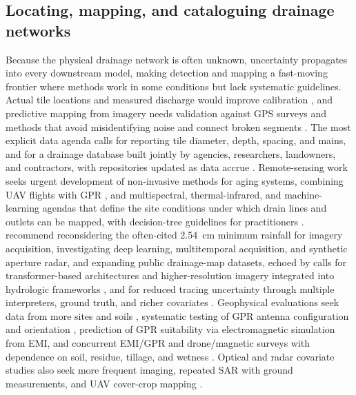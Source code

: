 \subsection{Locating, mapping, and cataloguing drainage networks}

Because the physical drainage network is often unknown, uncertainty propagates
into every downstream model, making detection and mapping a fast-moving frontier
where methods work in some conditions but lack systematic guidelines. Actual tile
locations and measured discharge would improve calibration
\parencite{Amado2018}, and predictive mapping from imagery needs validation
against GPS surveys and methods that avoid misidentifying noise and connect broken
segments \parencite{Naz2009,Schilling2019}. The most explicit data agenda calls
for reporting tile diameter, depth, spacing, and mains, and for a drainage
database built jointly by agencies, researchers, landowners, and contractors,
with repositories updated as data accrue
\parencite{Zhou2025,Valayamkunnath2020}. Remote-sensing work seeks urgent
development of non-invasive methods for aging systems, combining UAV flights with
GPR \parencite{Wienken2024}, and multispectral, thermal-infrared, and
machine-learning agendas that define the site conditions under which drain lines
and outlets can be mapped, with decision-tree guidelines for practitioners
\parencite{Allred2020,Allred2021,Allred2022}. \textcite{Carlsen2024} recommend
reconsidering the often-cited 2.54~cm minimum rainfall for imagery acquisition,
investigating deep learning, multitemporal acquisition, and synthetic aperture
radar, and expanding public drainage-map datasets, echoed by calls for
transformer-based architectures and higher-resolution imagery integrated into
hydrologic frameworks \parencite{Wan2024}, and for reduced tracing uncertainty
through multiple interpreters, ground truth, and richer covariates
\parencite{Redoloza2023,Harris2018,Yimer2023}. Geophysical evaluations seek data
from more sites and soils \parencite{Allred2005}, systematic testing of GPR
antenna configuration and orientation \parencite{Allred2013}, prediction of GPR
suitability via electromagnetic simulation from EMI, and concurrent EMI/GPR and
drone/magnetic surveys with dependence on soil, residue, tillage, and wetness
\parencite{Koganti2020,Koganti2021,Jouen2018,Kratt2020,Allred2018b}. Optical and
radar covariate studies also seek more frequent imaging, repeated SAR with
ground measurements, and UAV cover-crop mapping
\parencite{Tlapáková2017,Meunier2001,Xu2018}.

